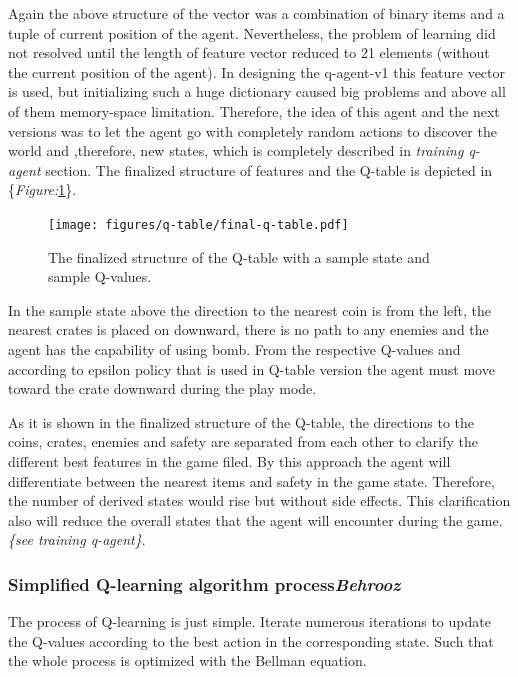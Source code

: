 \documentclass{article}
\begin{document}
Again the above structure of the vector was a combination of binary items and a tuple of current position of the agent. Nevertheless, the problem of learning did not resolved until the length of feature vector reduced to 21 elements (without the current position of the agent). In designing the q-agent-v1 this feature vector is used, but initializing such a huge dictionary caused big problems and above all of them memory-space limitation. Therefore, the idea of this agent and the next versions was to let the agent go with completely random actions to discover the world and ,therefore, new states, which is completely described in \textit{training q-agent} section. The finalized structure of features and the Q-table is depicted in \{\textit{Figure:}\ref{fig:final-q-table}\}. 



\begin{figure}[h]
    \centering
    \texttt{[image: figures/q-table/final-q-table.pdf]}
    \caption{The finalized structure of the Q-table with a sample state and sample Q-values. }
    \label{fig:final-q-table}
\end{figure}

In the sample state above the direction to the nearest coin is from the left, the nearest crates is placed on downward, there is no path to any enemies and the agent has the capability of using bomb. From the respective Q-values and according to epsilon policy that is used in Q-table version the agent must move toward the crate downward during the play mode.


As it is shown in the finalized structure of the Q-table, the directions to the coins, crates, enemies and safety are separated from each other to clarify the different best features in the game filed. By this approach the agent will differentiate between the nearest items and safety in the game state. Therefore, the number of derived states would rise but without side effects. This clarification also will reduce the overall states that the agent will encounter during the game. \textit{\{see training q-agent\}}.
 


\subsubsection[Simplified Q-learning algorithm process]{Simplified Q-learning algorithm process{\normalsize \normalfont \it \hfill Behrooz}}

The process of Q-learning is just simple. Iterate numerous iterations to update the Q-values according to the best action in the corresponding state. Such that the whole process is optimized with the Bellman equation.
\end{document}
